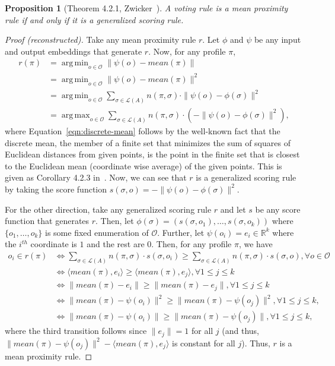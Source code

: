 \documentclass[10pt,letterpaper]{article}
\newcommand{\calL}{{\mathcal{L}}}
\newcommand{\rank}{{\calL(A)}}
\newcommand{\calO}{{\mathcal{O}}}
\DeclareMathOperator*{\argmax}{arg\,max}
\DeclareMathOperator*{\argmin}{arg\,min}
\newtheorem{proposition}{Proposition}
\begin{document}
\begin{proposition}[Theorem 4.2.1, Zwicker~\cite{Zwicker08a}]
A voting rule is a mean proximity rule if and only if it is a generalized scoring rule.
\label{prop:equiv}
\end{proposition}
\begin{proof}[Proof (reconstructed)]
Take any mean proximity rule $r$. Let $\phi$ and $\psi$ be any input and output embeddings that generate $r$. Now, for any profile $\pi$,
\begin{align}
r(\pi)  &= \argmin_{o \in \calO} \|\psi(o)-mean(\pi)\| \nonumber\\
&= \argmin_{o \in \calO} \|\psi(o)-mean(\pi)\|^2 \nonumber\\
&= \argmin_{o \in \calO} \sum_{\sigma \in \rank} n(\pi,\sigma) \cdot \|\psi(o)-\phi(\sigma)\|^2 \label{eqn:discrete-mean}\\
&= \argmax_{o \in \calO} \sum_{\sigma \in \rank} n(\pi,\sigma) \cdot \left( -\|\psi(o)-\phi(\sigma)\|^2 \right), \label{eqn:equiv-main}
\end{align}
where Equation~\eqref{eqn:discrete-mean} follows by the well-known fact that the discrete mean, the member of a finite set that minimizes the sum of squares of Euclidean distances from given points, is the point in the finite set that is closest to the Euclidean mean (coordinate wise average) of the given points.  This is given as Corollary 4.2.3 in~\cite{Zwicker08a}. Now, we can see that $r$ is a generalized scoring rule by taking the score function $s(\sigma,o) = -\|\psi(o)-\phi(\sigma)\|^2$. 

For the other direction, take any generalized scoring rule $r$ and let $s$ be any score function that generates $r$. Then, let $\phi(\sigma) = (s(\sigma,o_1),\ldots,s(\sigma,o_k))$ where $\{o_1,\ldots,o_k\}$ is some fixed enumeration of $\calO$. Further, let $\psi(o_i) = e_i \in \mathbb{R}^k$ where the $i^{th}$ coordinate is $1$ and the rest are $0$. Then, for any profile $\pi$, we have
\begin{align*}
o_i \in r(\pi) &\Leftrightarrow \sum_{\sigma \in \rank} n(\pi,\sigma) \cdot s(\sigma,o_i) \ge \sum_{\sigma \in \rank} n(\pi,\sigma) \cdot s(\sigma,o), \forall o \in \calO\\
&\Leftrightarrow \langle mean(\pi), e_i \rangle \ge \langle mean(\pi), e_j \rangle, \forall 1 \le j \le k \\
&\Leftrightarrow \|mean(\pi) - e_i\| \ge \|mean(\pi) - e_j\|, \forall 1 \le j \le k\\
&\Leftrightarrow \|mean(\pi) - \psi(o_i)\|^2 \ge \|mean(\pi) - \psi(o_j)\|^2, \forall 1 \le j \le k,\\
&\Leftrightarrow \|mean(\pi) - \psi(o_i)\| \ge \|mean(\pi) - \psi(o_j)\|, \forall 1 \le j \le k,
\end{align*}
where the third transition follows since $\|e_j\| = 1$ for all $j$ (and thus, $\|mean(\pi) - \psi(o_j)\|^2 - \langle mean(\pi), e_j \rangle$ is constant for all $j$). Thus, $r$ is a mean proximity rule.
\end{proof}
\end{document}
